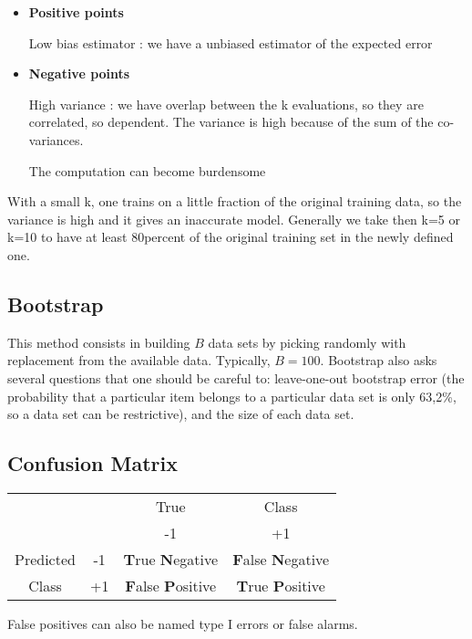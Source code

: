 \documentclass[a4paper,12pt]{article}
\begin{document}
\begin{itemize}
\item \textbf{Positive points}
	
    Low bias estimator : we have a unbiased estimator of the expected error 
\item \textbf{Negative points }
	
    High variance : we have overlap between the k evaluations, so they are correlated, so dependent. The variance is high because of the sum of the co-variances.
    
    The computation can become burdensome
\end{itemize}

With a small k, one trains on a little fraction of the original training data, so the variance is high and it gives an inaccurate model. Generally we take then k=5 or k=10 to have at least 80percent of the original training set in the newly defined one. 

\newpage
\subsection{Bootstrap}

This method consists in building $B$ data sets by picking randomly with replacement from the available data. Typically, $B=100$.
Bootstrap  also asks several questions that one should be careful to: leave-one-out bootstrap error (the probability that a particular item belongs to a particular data set is only 63,2\%, so a data set can be restrictive), and the size of each data set. 

\subsection{Confusion Matrix}

\begin{center}
\begin{tabular}{ c  c  c  c }
  & & True & Class \\ 
  &  & -1 & +1 \\  
 Predicted & -1 & \textbf{T}rue \textbf{N}egative & \textbf{F}alse \textbf{N}egative \\ 
 Class & +1 & \textbf{F}alse \textbf{P}ositive & \textbf{T}rue \textbf{P}ositive
\end{tabular}
\end{center}

False positives can also be named type I errors or false alarms.
\end{document}
